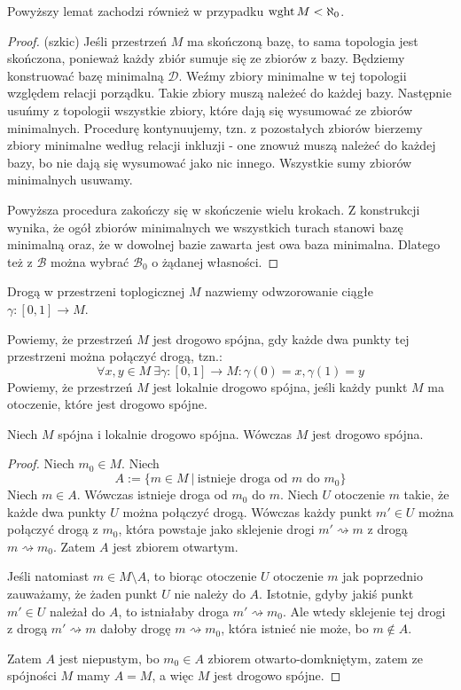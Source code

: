 \begin{fact}
  Powyższy lemat zachodzi również w przypadku $\operatorname{wght} M < \aleph_0$.
  \begin{proof}(szkic)
    Jeśli przestrzeń $M$ ma skończoną bazę, to sama topologia jest skończona, ponieważ każdy zbiór sumuje się ze zbiorów z bazy. Będziemy konstruować bazę minimalną $\mathcal D$. Weźmy zbiory minimalne w tej topologii względem relacji porządku. Takie zbiory muszą należeć do każdej bazy. Następnie usuńmy z topologii wszystkie zbiory, które dają się wysumować ze zbiorów minimalnych. Procedurę kontynuujemy, tzn. z pozostałych zbiorów bierzemy zbiory minimalne według relacji inkluzji - one znowuż muszą należeć do każdej bazy, bo nie dają się wysumować jako nic innego. Wszystkie sumy zbiorów minimalnych usuwamy.
    
    Powyższa procedura zakończy się w skończenie wielu krokach. Z konstrukcji wynika, że ogół zbiorów minimalnych we wszystkich turach stanowi bazę minimalną oraz, że w dowolnej bazie zawarta jest owa baza minimalna. Dlatego też z $\mathcal B$ można wybrać $\mathcal B_0$ o żądanej własności.
  \end{proof}
\end{fact}

\begin{df}
  Drogą w przestrzeni toplogicznej $M$ nazwiemy odwzorowanie ciągłe $\gamma: [0,1] \to M$.
\end{df}
\begin{df}
  Powiemy, że przestrzeń $M$ jest drogowo spójna, gdy każde dwa punkty tej przestrzeni można połączyć drogą, tzn.:
  \[
    \forall x,y \in M\ \exists \gamma: [0,1] \to M: \gamma(0) = x, \gamma(1) = y
  \]
  Powiemy, że przestrzeń $M$ jest lokalnie drogowo spójna, jeśli każdy punkt $M$ ma otoczenie, które jest drogowo spójne.

\end{df}


\begin{lem}
  Niech $M$ spójna i lokalnie drogowo spójna. Wówczas $M$ jest drogowo spójna.
  \begin{proof}
    Niech $m_0 \in M$. Niech
    \[
      A := \{m \in M\ |\ \mbox{istnieje droga od $m$ do $m_0$}\}
    \]
    Niech $m \in A$.
    Wówczas istnieje droga od $m_0$ do $m$.
    Niech $U$ otoczenie $m$ takie, że każde dwa punkty $U$ można połączyć drogą.
    Wówczas każdy punkt $m' \in U$ można połączyć drogą z $m_0$, która powstaje jako sklejenie drogi $m' \rightsquigarrow m$ z drogą $m \rightsquigarrow m_0$.
    Zatem $A$ jest zbiorem otwartym.
    
    Jeśli natomiast $m \in M \setminus A$, to biorąc otoczenie $U$ otoczenie $m$ jak poprzednio zauważamy, że żaden punkt $U$ nie należy do $A$. Istotnie, gdyby jakiś punkt $m' \in U$ należał do $A$, to istniałaby droga $m' \rightsquigarrow m_0$.
    Ale wtedy sklejenie tej drogi z drogą $m' \rightsquigarrow m$ dałoby drogę $m \rightsquigarrow m_0$, która istnieć nie może, bo $m \not\in A$.
    
    Zatem $A$ jest niepustym, bo $m_0 \in A$ zbiorem otwarto-domkniętym, zatem ze spójności $M$ mamy $A = M$, a więc $M$ jest drogowo spójne.
  \end{proof}
\end{lem}

